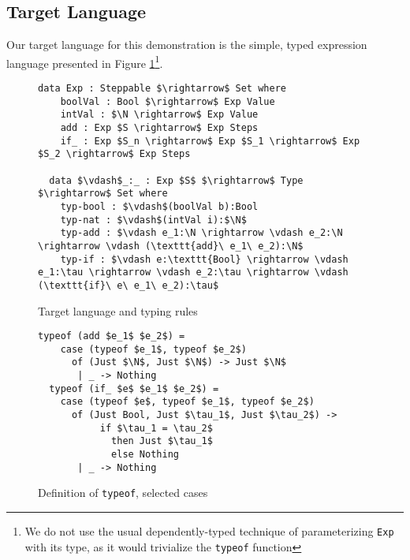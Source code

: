\documentclass[manuscript,screen,sigplan]{acmart}
\begin{document}
\subsection{Target Language}

Our target language for this demonstration is the simple, typed expression
language presented in Figure \ref{lang}\footnote{We do not use the usual
dependently-typed technique of parameterizing \texttt{Exp} with its type, as it
would trivialize the \texttt{typeof} function}.

\begin{figure}[htbp]
  \begin{lstlisting}[basicstyle=\small\ttfamily]
  data Exp : Steppable $\rightarrow$ Set where
    boolVal : Bool $\rightarrow$ Exp Value
    intVal : $\N \rightarrow$ Exp Value
    add : Exp $S \rightarrow$ Exp Steps
    if_ : Exp $S_n \rightarrow$ Exp $S_1 \rightarrow$ Exp $S_2 \rightarrow$ Exp Steps
    
  data $\vdash$_:_ : Exp $S$ $\rightarrow$ Type $\rightarrow$ Set where
    typ-bool : $\vdash$(boolVal b):Bool
    typ-nat : $\vdash$(intVal i):$\N$
    typ-add : $\vdash e_1:\N \rightarrow \vdash e_2:\N \rightarrow \vdash (\texttt{add}\ e_1\ e_2):\N$
    typ-if : $\vdash e:\texttt{Bool} \rightarrow \vdash e_1:\tau \rightarrow \vdash e_2:\tau \rightarrow \vdash (\texttt{if}\ e\ e_1\ e_2):\tau$
  \end{lstlisting}
  \caption{Target language and typing rules}
  \label{lang}
\end{figure}

\begin{figure}[htbp]
  \begin{lstlisting}[basicstyle=\small\ttfamily]
  typeof (add $e_1$ $e_2$) =
    case (typeof $e_1$, typeof $e_2$)
      of (Just $\N$, Just $\N$) -> Just $\N$
       | _ -> Nothing
  typeof (if_ $e$ $e_1$ $e_2$) =
    case (typeof $e$, typeof $e_1$, typeof $e_2$)
      of (Just Bool, Just $\tau_1$, Just $\tau_2$) ->
           if $\tau_1 = \tau_2$
             then Just $\tau_1$
             else Nothing
       | _ -> Nothing
  \end{lstlisting}
  \caption{Definition of \texttt{typeof}, selected cases
    \protect\footnotemark}\label{def:typeof}
\end{figure}

\end{document}
